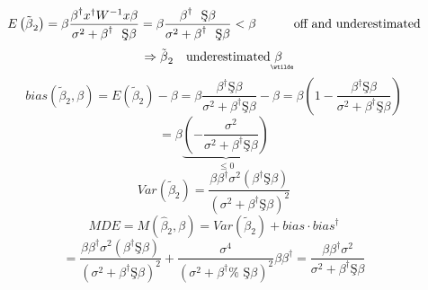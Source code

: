 \documentclass{article}
\begin{document}
\begin{equation*}
E\left( \tilde{\beta}_{2}\right) =\beta \frac{\beta ^{\dagger }x^{\dagger
}W^{-1}x\beta }{\sigma ^{2}+\beta ^{\dagger }\text{\c{S}}\beta }=\beta \frac{%
\beta ^{\dagger }\text{\c{S}}\beta }{\sigma ^{2}+\beta ^{\dagger }\text{\c{S}%
}\beta }<\beta \qquad \text{\ off and underestimated}
\end{equation*}%
\begin{equation*}
\Rightarrow \tilde{\beta}_{2}\text{ underestimated }%
\underaccent{\wtilde}{\beta}%
\end{equation*}%
\begin{equation*}
bias\left( \tilde{\beta}_{2},\beta \right) =E\left( \tilde{\beta}_{2}\right)
-\beta =\beta \frac{\beta ^{\dagger }\text{\c{S}}\beta }{\sigma ^{2}+\beta
^{\dagger }\text{\c{S}}\beta }-\beta =\beta \left( 1-\frac{\beta ^{\dagger }%
\text{\c{S}}\beta }{\sigma ^{2}+\beta ^{\dagger }\text{\c{S}}\beta }\right) 
\end{equation*}%
\begin{equation*}
=\beta \underset{\leq 0}{\underbrace{\left( -\frac{\sigma ^{2}}{\sigma
^{2}+\beta ^{\dagger }\text{\c{S}}\beta }\right) }}
\end{equation*}%
\begin{equation*}
Var\left( \tilde{\beta}_{2}\right) =\frac{\beta \beta ^{\dagger }\sigma
^{2}\left( \beta ^{\dagger }\text{\c{S}}\beta \right) }{\left( \sigma
^{2}+\beta ^{\dagger }\text{\c{S}}\beta \right) ^{2}}
\end{equation*}%
\begin{equation*}
MDE=M\left( \hat{\beta}_{2},\beta \right) =Var\left( \tilde{\beta}%
_{2}\right) +bias\cdot bias^{\dagger }
\end{equation*}%
\begin{equation*}
=\frac{\beta \beta ^{\dagger }\sigma ^{2}\left( \beta ^{\dagger }\text{\c{S}}%
\beta \right) }{\left( \sigma ^{2}+\beta ^{\dagger }\text{\c{S}}\beta
\right) ^{2}}+\frac{\sigma ^{4}}{\left( \sigma ^{2}+\beta ^{\dagger }\text{%
\c{S}}\beta \right) ^{2}}\beta \beta ^{\dagger }=\frac{\beta \beta ^{\dagger
}\sigma ^{2}}{\sigma ^{2}+\beta ^{\dagger }\text{\c{S}}\beta }
\end{equation*}
\end{document}

